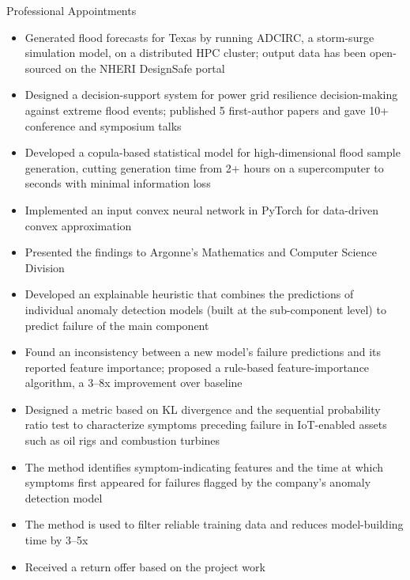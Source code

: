 \begin{rSection}{Professional Appointments}
\begin{itemize}
    \item Generated flood forecasts for Texas by running ADCIRC, a storm-surge simulation model, on a distributed HPC cluster; output data has been open-sourced on the NHERI DesignSafe portal
    \item Designed a decision-support system for power grid resilience decision-making against extreme flood events; published 5 first-author papers and gave 10+ conference and symposium talks
    \item Developed a copula-based statistical model for high-dimensional flood sample generation, cutting generation time from 2+ hours on a supercomputer to seconds with minimal information loss
\end{itemize}
\medskip

\begin{itemize}
    \item Implemented an input convex neural network in PyTorch for data-driven convex approximation
    \item Presented the findings to Argonne's Mathematics and Computer Science Division
\end{itemize}
\medskip

\begin{itemize}
    \item Developed an explainable heuristic that combines the predictions of individual anomaly detection models (built at the sub-component level) to predict failure of the main component
    \item Found an inconsistency between a new model's failure predictions and its reported feature importance; proposed a rule-based feature-importance algorithm, a 3--8x improvement over baseline
\end{itemize}
\medskip

\begin{itemize}
    \item Designed a metric based on KL divergence and the sequential probability ratio test to characterize symptoms preceding failure in IoT-enabled assets such as oil rigs and combustion turbines
    \item The method identifies symptom-indicating features and the time at which symptoms first appeared for failures flagged by the company's anomaly detection model
    \item The method is used to filter reliable training data and reduces model-building time by 3--5x
    \item Received a return offer based on the project work
\end{itemize}
\medskip


\end{rSection}
